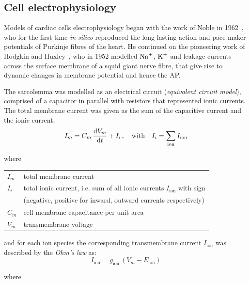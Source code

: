 %
%
%
\subsection{Cell electrophysiology}\label{sec:cell_ep_modelling}
Models of cardiac cells electrophysiology began with the work of Noble in 1962~\cite{Noble:1962}, who for the first time \textit{in silico} reproduced the long-lasting action and pace-maker potentials of Purkinje fibres of the heart. He continued on the pioneering work of Hodgkin and Huxley~\cite{Hodgkin:1952}, who in 1952 modelled $\textrm{Na}^{+}$, $\textrm{K}^{+}$ and leakage currents across the surface membrane of a squid giant nerve fibre, that give rise to dynamic changes in membrane potential and hence the AP.

\vspace{0.2cm}
The sarcolemma was modelled as an electrical circuit (\textit{equivalent circuit model}), comprised of a capacitor in parallel with resistors that represented ionic currents. The total membrane current was given as the sum of the capacitive current and the ionic current:
%
\begin{equation}\label{eq:membranecurrent}
I_m = C_m\,\dfrac{\mathrm{d}{V_m}}{\mathrm{d}{t}} + I_i\,,\quad\text{with}\quad I_i = \sum_{\textrm{ion}}I_\textrm{ion}
\end{equation}

\noindent
where

\vspace{0.2cm}
\begin{tabular}{ll}
    $I_m$            & total membrane current \\
    $I_i$            & total ionic current, i.e. sum of all ionic currents $I_\textrm{ion}$ with sign \\
    & (negative, positive for inward, outward currents respectively) \\ 
    $C_m$            & cell membrane capacitance per unit area \\
    $V_m$            & transmembrane voltage
\end{tabular}

\vspace{0.2cm}\noindent
and for each ion species the corresponding transmembrane current $I_{\textrm{ion}}$ was described by the \textit{Ohm's law} as:
%
\begin{equation}\label{eq:ohmslawsinglechannel}
    I_{\textrm{ion}} = g_{\textrm{ion}}\,(V_m-E_{\textrm{ion}})
\end{equation}

\noindent
where

